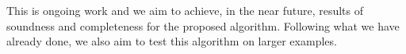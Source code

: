 
This is
ongoing work and we aim to achieve, in the near future, results of
soundness and completeness for the proposed algorithm. Following what
we have already done, we also aim to test this algorithm on larger
examples.

